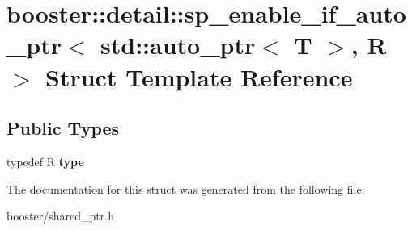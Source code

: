 \section{booster\+:\+:detail\+:\+:sp\+\_\+enable\+\_\+if\+\_\+auto\+\_\+ptr$<$ std\+:\+:auto\+\_\+ptr$<$ T $>$, R $>$ Struct Template Reference}
\label{structbooster_1_1detail_1_1sp__enable__if__auto__ptr_3_01std_1_1auto__ptr_3_01T_01_4_00_01R_01_4}
\subsection*{Public Types}
\begin{DoxyCompactItemize}
\item 
typedef R {\bfseries type}\label{structbooster_1_1detail_1_1sp__enable__if__auto__ptr_3_01std_1_1auto__ptr_3_01T_01_4_00_01R_01_4_af21be73e74cd69e96f1c901efd574552}

\end{DoxyCompactItemize}


The documentation for this struct was generated from the following file\+:\begin{DoxyCompactItemize}
\item 
booster/shared\+\_\+ptr.\+h\end{DoxyCompactItemize}
